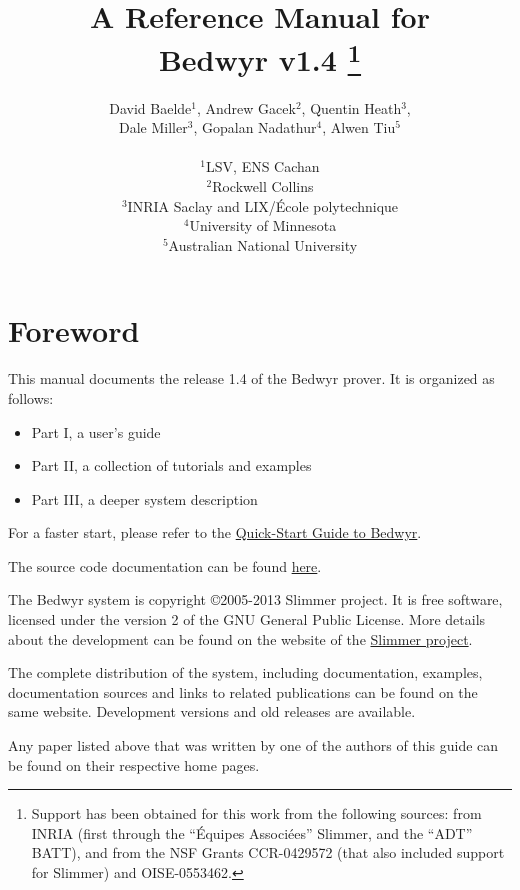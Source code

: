 \documentclass[a4paper]{article} %
\title{{\Huge A Reference Manual for\\Bedwyr v1.4}
   \thanks{Support has been obtained for this work from the following
           sources: from INRIA (first through the ``\'Equipes
           Associ{\'e}es'' Slimmer, and the ``ADT'' BATT),
           and from the NSF Grants CCR-0429572 (that also included
           support for Slimmer) and OISE-0553462.}
}
\author{David Baelde$^1$,
        Andrew Gacek$^2$,
        Quentin Heath$^3$,\\
        Dale Miller$^3$,
        Gopalan Nadathur$^4$,
        Alwen Tiu$^5$\\\\
        $^1$LSV, ENS Cachan\\
        $^2$Rockwell Collins\\
        $^3$INRIA Saclay and LIX/\'Ecole polytechnique\\
        $^4$University of Minnesota\\
        $^5$Australian National University}
\begin{document}
\maketitle
\tableofcontents
\newpage


\section*{Foreword}

This manual documents the release 1.4 of the Bedwyr prover.  It is
organized as follows:
\begin{itemize}
  \item Part I, a user's guide
  \item Part II, a collection of tutorials and examples
  \item Part III, a deeper system description
\end{itemize}

For a faster start, please refer to the
\href{http://slimmer.gforge.inria.fr/bedwyr/doc/quickstart.html}
  {Quick-Start Guide to Bedwyr}.

The source code documentation can be found
\href{http://slimmer.gforge.inria.fr/bedwyr/doc/libref/}{here}.

The Bedwyr system is copyright \copyright 2005-2013 Slimmer project.  It
is free software, licensed under the version 2 of the GNU General Public
License.  More details about the development can be found on the website
of the \href{http://slimmer.gforge.inria.fr/}{Slimmer project}.

The complete distribution of the system, including documentation,
examples, documentation sources and links to related publications can be
found on the same website.  Development versions and old releases are
available.



\appendix



\noindent Any paper listed above that was written by one of the authors
of this guide can be found on their respective home pages.
\end{document}
